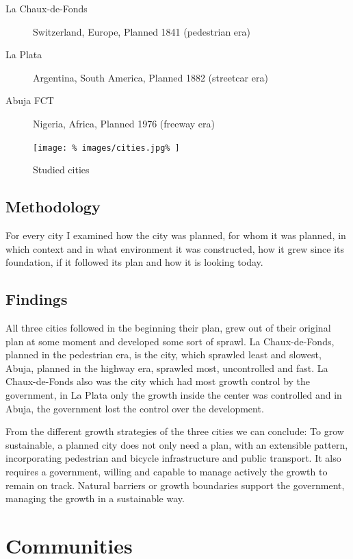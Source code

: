 \documentclass{article}
\begin{document}
		\begin{description}
			\item [La Chaux-de-Fonds] Switzerland, Europe, Planned 1841 (pedestrian era)
			\item [La Plata] Argentina, South America, Planned 1882 (streetcar era)
			\item [Abuja FCT] Nigeria, Africa, Planned 1976 (freeway era)
		\end{description}
		
		\begin{figure}[H]
			\texttt{[image: \%
				images/cities.jpg\%
			]}
			\caption{Studied cities \cite{BingMaps:Cities}}
			\label{fig:map:analyzed-cities}
		\end{figure}

		\subsection{Methodology}
		For every city I examined how the city was planned, for whom it was planned, in which context and in what environment it was constructed, how it grew since its foundation, if it followed its plan and how it is looking today.

		\subsection{Findings}
		All three cities followed in the beginning their plan, grew out of their original plan at some moment and developed some sort of sprawl.
		La Chaux-de-Fonds, planned in the pedestrian era, is the city, which sprawled least and slowest, Abuja, planned in the highway era, sprawled most, uncontrolled and fast.
		La Chaux-de-Fonds also was the city which had most growth control by the government, in La Plata only the growth inside the center was controlled and in Abuja, the government lost the control over the development.
		
		From the different growth strategies of the three cities we can conclude:
		To grow sustainable, a planned city does not only need a plan, with an extensible pattern, incorporating pedestrian and bicycle infrastructure and public transport. It also requires a government, willing and capable to manage actively the growth to remain on track.
		Natural barriers or growth boundaries support the government, managing the growth in a sustainable way.



	\clearpage	
	\section{Communities}
	
\end{document}
